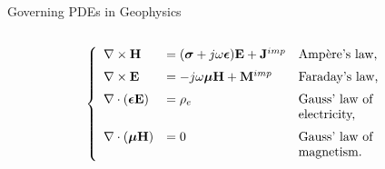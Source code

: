 \begin{frame}{Governing PDEs in Geophysics}
\begin{columns}
\begin{column}{0.55\textwidth}
\vspace{0,15cm}
\begin{equation}
\notag
\left\{
                \begin{array}{lll}
                \vspace{0,2cm}
                  \mathbf{\nabla} \times \mathbf{H} & = (\boldsymbol{\sigma} + j \omega \boldsymbol{\epsilon})\mathbf{E} + \mathbf{J}^{imp} & \textup{Ampère's law,}\\
                  \vspace{0,2cm}
                  \mathbf{\nabla} \times \mathbf{E} & = -j \omega \boldsymbol{\mu}\mathbf{H} + \mathbf{M}^{imp} & \textup{Faraday's law,}\\
                  \mathbf{\nabla} \cdot (\boldsymbol{\epsilon}\mathbf{E}) & = \rho_{e} & \textup{Gauss' law of} \\
                  \vspace{0,2cm}
                  & & \textup{electricity,} \\
                  \mathbf{\nabla} \cdot (\boldsymbol{\mu}\mathbf{H}) & =0 & \textup{Gauss' law of} \\
                 & & \textup{magnetism.}
                \end{array}
              \right.
\end{equation}
\end{column}
\end{columns}
\end{frame}
